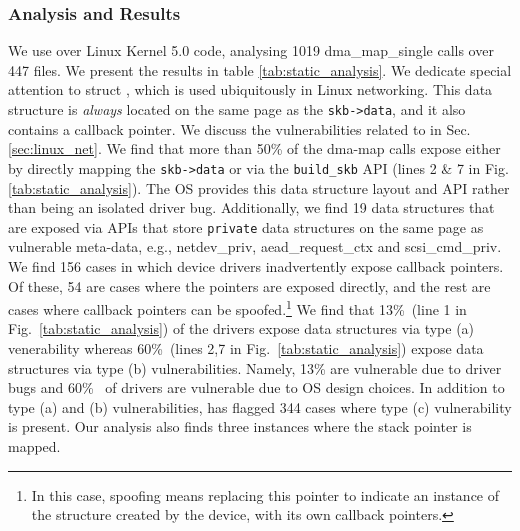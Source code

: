 \subsubsection{Analysis and Results}
We use \tool over Linux Kernel 5.0 code,
analysing 1019 dma\_map\_single calls over 447 files. We present the results in table \ref{tab:static_analysis}. We dedicate special attention to struct \shinfo, which is used ubiquitously in Linux networking. This data structure is \textit{always} located on the same page as the \texttt{skb->data}, and it also contains a callback pointer. We discuss the vulnerabilities related to \shinfo in Sec. \ref{sec:linux_net}. We find that more than 50\% of the dma-map calls expose \shinfo either by directly mapping the \texttt{skb->data} or via the \texttt{build\_skb} API (lines 2 \& 7 in Fig. \ref{tab:static_analysis}). The OS provides this data structure layout and API rather than being an isolated driver bug. Additionally, we find 19 data structures that are exposed via APIs that store \texttt{private} data structures on the same page as vulnerable meta-data, e.g., netdev\_priv, aead\_request\_ctx and scsi\_cmd\_priv. We find 156 cases in which device drivers inadvertently expose callback pointers. Of these, 54 are cases where the pointers are exposed directly, and the rest are cases where callback pointers can be spoofed.\footnote{In this case, spoofing means replacing this pointer to indicate an instance of the structure created by the device, with its own callback pointers.}
We find that 13\%~(line 1 in Fig.~\ref{tab:static_analysis}) of the drivers expose data structures via type (a) venerability whereas 60\%~(lines 2,7 in Fig.~\ref{tab:static_analysis}) expose data structures via type (b) vulnerabilities. Namely, 13\% are vulnerable due to driver bugs and 60\%~ of drivers are vulnerable due to OS design choices. 
In addition to type (a) and (b) vulnerabilities, \tool has flagged 344 cases where type (c) vulnerability is present.
Our analysis also finds three instances where the stack pointer is mapped.

